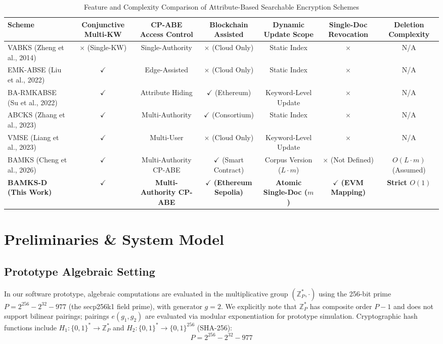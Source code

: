 \documentclass[conference]{IEEEtran}
\begin{document}
\begin{table}[htbp]
\caption{Feature and Complexity Comparison of Attribute-Based Searchable Encryption Schemes}
\label{tab:comparison}
\centering
\begin{tabular}{lcccccc}
\toprule
\textbf{Scheme} & \textbf{Conjunctive Multi-KW} & \textbf{CP-ABE Access Control} & \textbf{Blockchain Assisted} & \textbf{Dynamic Update Scope} & \textbf{Single-Doc Revocation} & \textbf{Deletion Complexity} \\
\midrule
VABKS (Zheng et al., 2014) \cite{zheng2014vabks} & $\times$ (Single-KW) & Single-Authority & $\times$ (Cloud Only) & Static Index & $\times$ & N/A \\
EMK-ABSE (Liu et al., 2022) \cite{liu2022emk} & $\checkmark$ & Edge-Assisted & $\times$ (Cloud Only) & Static Index & $\times$ & N/A \\
BA-RMKABSE (Su et al., 2022) \cite{su2022barmk} & $\checkmark$ & Attribute Hiding & $\checkmark$ (Ethereum) & Keyword-Level Update & $\times$ & N/A \\
ABCKS (Zhang et al., 2023) \cite{zhang2023abcks} & $\checkmark$ & Multi-Authority & $\checkmark$ (Consortium) & Static Index & $\times$ & N/A \\
VMSE (Liang et al., 2023) \cite{liang2023vmse} & $\checkmark$ & Multi-User & $\times$ (Cloud Only) & Keyword-Level Update & $\times$ & N/A \\
BAMKS (Cheng et al., 2026) \cite{cheng2026bamks} & $\checkmark$ & Multi-Authority CP-ABE & $\checkmark$ (Smart Contract) & Corpus Version ($L \cdot m$) & $\times$ (Not Defined) & $O(L \cdot m)$ (Assumed) \\
\textbf{BAMKS-D (This Work)} & $\checkmark$ & \textbf{Multi-Authority CP-ABE} & $\checkmark$ \textbf{(Ethereum Sepolia)} & \textbf{Atomic Single-Doc ($m$)} & $\checkmark$ \textbf{(EVM Mapping)} & \textbf{Strict $O(1)$} \\
\bottomrule
\end{tabular}
\end{table}

\section{Preliminaries \& System Model}

\subsection{Prototype Algebraic Setting}
In our software prototype, algebraic computations are evaluated in the multiplicative group $(\mathbb{Z}_P^*, \cdot)$ using the 256-bit prime $P = 2^{256} - 2^{32} - 977$ (the secp256k1 field prime), with generator $g = 2$. We explicitly note that $\mathbb{Z}_P^*$ has composite order $P-1$ and does not support bilinear pairings; pairings $e(g_1, g_2)$ are evaluated via modular exponentiation for prototype simulation. Cryptographic hash functions include $H_1: \{0,1\}^* \to \mathbb{Z}_P^*$ and $H_2: \{0,1\}^* \to \{0,1\}^{256}$ (SHA-256):
\begin{equation}
P = 2^{256} - 2^{32} - 977
\end{equation}
\end{document}
